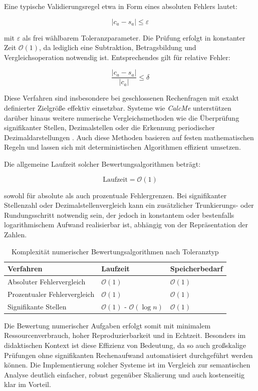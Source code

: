 \documentclass[a4paper,12pt]{article}
\begin{document}
Eine typische Validierungsregel etwa in Form eines absoluten Fehlers lautet:

\[
|c_a - s_a| \leq \varepsilon
\]

mit \(\varepsilon\) als frei wählbarem Toleranzparameter. Die Prüfung erfolgt in konstanter Zeit \( \mathcal{O}(1) \), da lediglich eine Subtraktion, Betragsbildung und Vergleichsoperation notwendig ist. Entsprechendes gilt für relative Fehler:

\[
\frac{|c_a - s_a|}{|c_a|} \leq \delta
\]

Diese Verfahren sind insbesondere bei geschlossenen Rechenfragen mit exakt definierter Zielgröße effektiv einsetzbar. Systeme wie \textit{CalcMe} unterstützen darüber hinaus weitere numerische Vergleichsmethoden wie die Überprüfung signifikanter Stellen, Dezimalstellen oder die Erkennung periodischer Dezimaldarstellungen \parencite{calcme}. Auch diese Methoden basieren auf festen mathematischen Regeln und lassen sich mit deterministischen Algorithmen effizient umsetzen.

Die allgemeine Laufzeit solcher Bewertungsalgorithmen beträgt:

\[
\text{Laufzeit} = \mathcal{O}(1)
\]

sowohl für absolute als auch prozentuale Fehlergrenzen. Bei signifikanter Stellenzahl oder Dezimalstellenvergleich kann ein zusätzlicher Trunkierungs- oder Rundungsschritt notwendig sein, der jedoch in konstantem oder bestenfalls logarithmischem Aufwand realisierbar ist, abhängig von der Repräsentation der Zahlen.

\begin{table}[h!]
\centering
\begin{tabular}{@{}lll@{}}
\toprule
\textbf{Verfahren} & \textbf{Laufzeit} & \textbf{Speicherbedarf} \\
\midrule
Absoluter Fehlervergleich & \( \mathcal{O}(1) \) & \( \mathcal{O}(1) \) \\
Prozentualer Fehlervergleich & \( \mathcal{O}(1) \) & \( \mathcal{O}(1) \) \\
Signifikante Stellen & \( \mathcal{O}(1) \) - \( \mathcal{O}(\log n) \) & \( \mathcal{O}(1) \) \\
\bottomrule
\end{tabular}
\caption{Komplexität numerischer Bewertungsalgorithmen nach Toleranztyp}
\end{table}

Die Bewertung numerischer Aufgaben erfolgt somit mit minimalem Ressourcenverbrauch, hoher Reproduzierbarkeit und in Echtzeit. Besonders im didaktischen Kontext ist diese Effizienz von Bedeutung, da so auch großskalige Prüfungen ohne signifikanten Rechenaufwand automatisiert durchgeführt werden können. Die Implementierung solcher Systeme ist im Vergleich zur semantischen Analyse deutlich einfacher, robust gegenüber Skalierung und auch kostenseitig klar im Vorteil.
\end{document}
